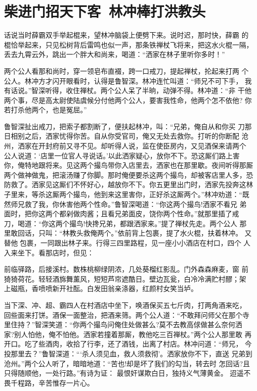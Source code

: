 \chapter{柴进门招天下客~林冲棒打洪教头}

话说当时薛霸双手举起棍来，望林冲脑袋上便劈下来。说时迟，那时快，薛霸
的棍恰举起来，只见松树背后雷鸣也似一声，那条铁禅杖飞将来，把这水火棍一隔，
丢去九霄云外，跳出一个胖大和尚来，喝道：“洒家在林子里听你多时！”

两个公人看那和尚时，穿一领皂布直裰，跨一口戒刀，提起禅杖，抡起来打两
个公人。林冲方才闪开眼看时，认得是鲁智深。林冲连忙叫道：“师兄不可下手，
我有话说。”智深听得，收住禅杖。两个公人呆了半晌，动弹不得。林冲道：“非
干他两个事，尽是高太尉使陆虞候分付他两个公人，要害我性命，他两个怎不依他?
你若打杀他两个，也是冤屈。”

鲁智深扯出戒刀，把索子都割断了，便扶起林冲，叫：“兄弟，俺自从和你买
刀那日相别之后，洒家忧得你苦。自从你受官司，俺又无处去救你。打听的你断配
沧州，洒家在开封府前又寻不见。却听得人说，监在使臣房内，又见酒保来请两个
公人说道：‘店里一位官人寻说话。’以此洒家疑心，放你不下。恐这厮们路上害
你，俺特地跟将来。见这两个撮鸟带你入店里去，洒家也在那里歇。夜间听得那厮
两个做神做鬼，把滚汤赚了你脚。那时俺便要杀这两个撮鸟，却被客店里人多，恐
防救了。洒家见这厮们不怀好心，越放你不下。你五更里出门时，洒家先投奔这林
子里来，等杀这厮两个撮鸟，他到来这里害你，正好杀这厮两个。”林冲劝道：“既
然师兄救了我，你休害他两个性命。”鲁智深喝道：“你这两个撮鸟!洒家不看兄
弟面时，把你这两个都剁做肉酱；且看兄弟面皮，饶你两个性命。”就那里插了戒
刀，喝道：“你这两个撮鸟!快搀兄弟，都跟洒家来。”提了禅杖先走。两个公人
那里敢回话，只叫：“林教头救俺两个。”依前背上包裹，提了水火棍，扶着林冲。
又替他包裹，一同跟出林子来。行得三四里路程，见一座小小酒店在村口，四个
人入来坐下。看那店时，但见：

前临驿路，后接溪村。数株桃柳绿阴浓，几处葵榴红影乱。门外森森麻麦，窗
前猗猗荷花。轻轻酒旆舞薰风，短短芦帘遮酷日。壁边瓦瓮，白冷冷满贮村醪；架
上磁瓶，香喷喷新开社酝。白发田翁亲涤器，红颜村女笑当垆。

当下深、冲、超、霸四人在村酒店中坐下，唤酒保买五七斤肉，打两角酒来吃，
回些面来打饼。酒保一面整治，把酒来筛。两个公人道：“不敢拜问师父在那个寺
里住持？”智深笑道：“你两个撮鸟问俺住处做甚么?莫不去教高俅做甚么奈何洒
家?别人怕他，俺不怕他。洒家若撞着那厮，教他吃三百禅杖。”两个公人那里敢
再开口。吃了些酒肉，收拾了行李，还了酒钱，出离了村店。林冲问道：“师兄，
今投那里去？”鲁智深道：“‘杀人须见血，救人须救彻’。洒家放你不下，直送
兄弟到沧州。”两个公人听了，暗暗地道：“苦也!却是坏了我们的勾当，转去时
怎回话?且只得随顺他，一处行路。”有诗为证：
最恨奸谋欺白日，独持义气薄黄金。
迢遥不畏千程路，辛苦惟存一片心。

